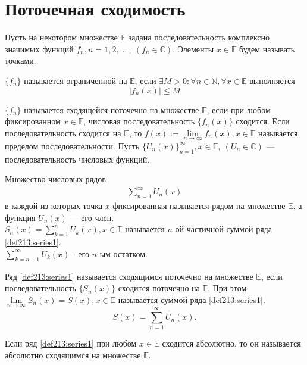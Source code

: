 \section{Поточечная сходимость}
Пусть на некотором множестве $\mathbb{E}$ задана последовательность
комплексно значимых функций $f_n, n = 1, 2, \dots \ , \ (f_n \in \mathbb{C})$.
Элементы $x \in \mathbb{E}$ будем называть точками.
\begin{definition}
  $\{f_n\}$ называется ограниченной на $\mathbb{E}$, если
  $\exists M > 0: \forall n \in \mathbb{N}, \forall x \in \mathbb{E}$ выполняется
  $$|f_n(x)| \leq M$$
\end{definition}

\begin{definition}
  $\{f_n\}$ называется сходящейся поточечно на множестве $\mathbb{E}$, если
  при любом фиксированном $x \in \mathbb{E}$, числовая последовательность
  $\{f_n(x)\}$ сходится. Если последовательность сходится на $\mathbb{E}$,
  то $f(x) := \lim\limits_{n \to \infty} f_n(x), x \in \mathbb{E}$ называется
  пределом последовательности. Пусть
  $\{U_n(x)\}_{n = 1}^\infty, x \in \mathbb{E}, \ (U_n \in \mathbb{C})$
  --- последовательность числовых функций.
\end{definition}

\begin{definition}
  Множество числовых рядов
  \begin{gather}
    \sum\limits_{n = 1}^{\infty} U_n(x) \label{def213:series1}
  \end{gather}
  в каждой из которых точка $x$ фиксированная называется рядом на множестве
  $\mathbb{E}$, а функция $U_n(x)$ --- его член. \\
  $S_n(x) = \sum\limits_{k = 1}^{n} U_k(x), x \in \mathbb{E}$ называется
  $n$-ой частичной суммой ряда \ref{def213:series1}. \\
  $\sum\limits_{k = n + 1}^{\infty} U_k(x)$ - его $n$-ым остатком.
\end{definition}

\begin{definition}
  Ряд \ref{def213:series1} называется сходящимся поточечно на множестве
  $\mathbb{E}$, если последовательность $\{S_n(x)\}$ сходится поточечно на
  $\mathbb{E}$. При этом $\lim\limits_{n \to \infty} S_n(x) = S(x), x \in \mathbb{E}$
  называется суммой ряда \ref{def213:series1}.
  $$S(x) = \sum\limits_{n = 1}^{\infty} U_n(x).$$
\end{definition}

\begin{definition}
  Если ряд \ref{def213:series1} при любом $x \in \mathbb{E}$ сходится абсолютно,
  то он называется абсолютно сходящимся на множестве $\mathbb{E}$.
\end{definition}

